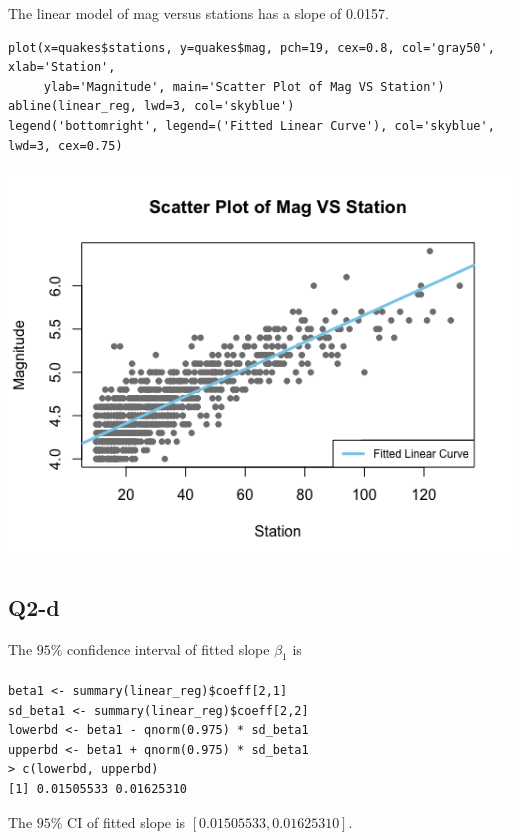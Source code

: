 \documentclass[12pt,letterpaper]{article}
\let\hat\widehat
\begin{document}
\noindent The linear model of mag versus stations has a slope of 0.0157.

\begin{verbatim}
plot(x=quakes$stations, y=quakes$mag, pch=19, cex=0.8, col='gray50', xlab='Station',
     ylab='Magnitude', main='Scatter Plot of Mag VS Station')
abline(linear_reg, lwd=3, col='skyblue')
legend('bottomright', legend=('Fitted Linear Curve'), col='skyblue', lwd=3, cex=0.75)
\end{verbatim}

\includegraphics[width=150mm]{scatter_linear.png}

\newpage
\subsection*{Q2-d}
\noindent The $95 \%$ confidence interval of fitted slope $\beta_1$ is 
\begin{align*}
[\hat{\beta_1} - Z_{0.975} \cdot sd(\hat{\beta_1}), \hat{\beta_1} + Z_{0.975} \cdot sd(\hat{\beta_1}) ]
\end{align*}

\begin{verbatim}
beta1 <- summary(linear_reg)$coeff[2,1]
sd_beta1 <- summary(linear_reg)$coeff[2,2]
lowerbd <- beta1 - qnorm(0.975) * sd_beta1
upperbd <- beta1 + qnorm(0.975) * sd_beta1
> c(lowerbd, upperbd)
[1] 0.01505533 0.01625310
\end{verbatim}

\noindent The $95 \%$ CI of fitted slope is $[0.01505533, 0.01625310]$.

\end{document}
